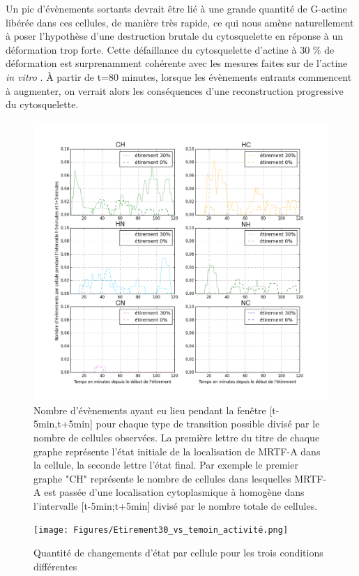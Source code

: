 \documentclass{report}
\begin{document}
Un pic d'évènements sortants devrait être lié à une grande quantité de G-actine libérée dans ces cellules, de manière très rapide, ce qui nous amène naturellement à poser l'hypothèse d'une destruction brutale du cytosquelette en réponse à un déformation trop forte. Cette défaillance du cytosquelette d'actine à 30 \% de déformation est surprenamment cohérente avec les mesures faites sur de l'actine \textit{in vitro} \cite{janmey}. 
À partir de t=80 minutes, lorsque les évènements entrants commencent à augmenter, on verrait alors les conséquences d'une reconstruction progressive du cytosquelette. 

 
\begin{figure}
\includegraphics[scale=0.5]{Figures/Etirement30_vs_0_translocations.png}
\caption{\label{Et30_transloc} Nombre d'évènements ayant eu lieu pendant la fenêtre [t-5min,t+5min] pour chaque type de transition possible divisé par le nombre de cellules observées. La première lettre du titre de chaque graphe représente l'état initiale de la localisation de MRTF-A dans la cellule, la seconde lettre l'état final. Par exemple le premier graphe "CH" représente le nombre de cellules dans lesquelles MRTF-A est passée d'une localisation cytoplasmique à homogène dans l'intervalle [t-5min;t+5min] divisé par le nombre totale de cellules. }
\end{figure}

\begin{figure}
\texttt{[image: Figures/Etirement30\_vs\_temoin\_activité.png]}
\caption{\label{Et30_activité} Quantité de changements d'état par cellule pour les trois conditions différentes}
\end{figure}
\end{document}
